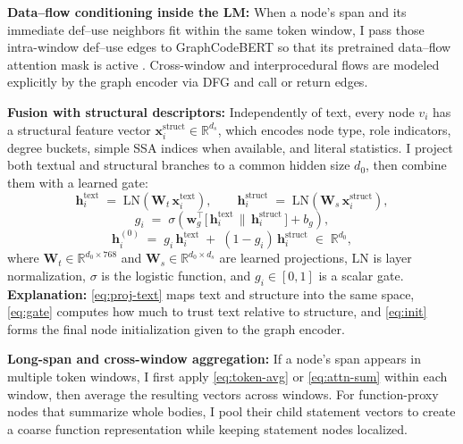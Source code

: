 \documentclass{buthesis}
\begin{document}
\textbf{Data–flow conditioning inside the LM:}
When a node’s span and its immediate def–use neighbors fit within the same token window, I pass those intra-window def–use edges to GraphCodeBERT so that its pretrained data–flow attention mask is active \cite{guo2021graphcodebert}. Cross-window and interprocedural flows are modeled explicitly by the graph encoder via DFG and call or return edges.

\textbf{Fusion with structural descriptors:}
Independently of text, every node $v_i$ has a structural feature vector $\mathbf{x}^{\text{struct}}_i\in\mathbb{R}^{d_s}$, which encodes node type, role indicators, degree buckets, simple SSA indices when available, and literal statistics. I project both textual and structural branches to a common hidden size $d_0$, then combine them with a learned gate:
\begin{equation}
\label{eq:proj-text}
\mathbf{h}^{\text{text}}_i \;=\; \mathrm{LN}\!\left(\mathbf{W}_t\, \mathbf{x}^{\text{text}}_i\right), 
\qquad
\mathbf{h}^{\text{struct}}_i \;=\; \mathrm{LN}\!\left(\mathbf{W}_s\, \mathbf{x}^{\text{struct}}_i\right),
\end{equation}
\begin{equation}
\label{eq:gate}
g_i \;=\; \sigma\!\left(\mathbf{w}_g^\top \big[\, \mathbf{h}^{\text{text}}_i \,\|\, \mathbf{h}^{\text{struct}}_i \,\big] + b_g \right),
\end{equation}
\begin{equation}
\label{eq:init}
\mathbf{h}^{(0)}_i \;=\; g_i \,\mathbf{h}^{\text{text}}_i \;+\; (1{-}g_i)\,\mathbf{h}^{\text{struct}}_i \;\in\; \mathbb{R}^{d_0},
\end{equation}
where $\mathbf{W}_t\!\in\!\mathbb{R}^{d_0\times 768}$ and $\mathbf{W}_s\!\in\!\mathbb{R}^{d_0\times d_s}$ are learned projections, $\mathrm{LN}$ is layer normalization, $\sigma$ is the logistic function, and $g_i\!\in\![0,1]$ is a scalar gate. \textbf{Explanation:} \eqref{eq:proj-text} maps text and structure into the same space, \eqref{eq:gate} computes how much to trust text relative to structure, and \eqref{eq:init} forms the final node initialization given to the graph encoder.

\textbf{Long-span and cross-window aggregation:}
If a node’s span appears in multiple token windows, I first apply \eqref{eq:token-avg} or \eqref{eq:attn-sum} within each window, then average the resulting vectors across windows. For function-proxy nodes that summarize whole bodies, I pool their child statement vectors to create a coarse function representation while keeping statement nodes localized.
\end{document}

